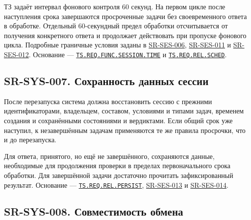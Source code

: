 \documentclass[12pt,a4paper]{article}
\begin{document}
ТЗ задаёт интервал фонового контроля 60 секунд. На первом цикле после наступления срока завершаются просроченные задачи без своевременного ответа в обработке. Отдельный 60-секундный предел обработки отсчитывается от получения конкретного ответа и продолжает действовать при пропуске фонового цикла. Подробные граничные условия заданы в {\hyperlink{sr-ses-006}{SR-SES-006}}, {\hyperlink{sr-ses-011}{SR-SES-011}} и {\hyperlink{sr-ses-012}{SR-SES-012}}. Основание --- {\href{../02\_Техническое\_задание/DOC-02\_Техническое\_задание.pdf\#ts-req-func-session-time}{\texttt{TS.\allowbreak{}REQ.\allowbreak{}FUNC.\allowbreak{}SESSION.\allowbreak{}TIME}}} и {\href{../02\_Техническое\_задание/DOC-02\_Техническое\_задание.pdf\#ts-req-rel-sched}{\texttt{TS.\allowbreak{}REQ.\allowbreak{}REL.\allowbreak{}SCHED}}}.

\subsection{SR-SYS-007. Сохранность данных сессии}\label{sr-sys-007-ux441ux43eux445ux440ux430ux43dux43dux43eux441ux442ux44c-ux434ux430ux43dux43dux44bux445-ux441ux435ux441ux441ux438ux438}

\hypertarget{sr-sys-007-сохранность-данных-сессии}{}

\hypertarget{sr-sys-007}{}

После перезапуска система должна восстановить сессию с прежними идентификаторами, владельцем, составом, условиями и типами задач, временем создания и сохранёнными состояниями и вердиктами. Если общий срок уже наступил, к незавершённым задачам применяются те же правила просрочки, что и до перезапуска.

Для ответа, принятого, но ещё не завершённого, сохраняются данные, необходимые для продолжения проверки в пределах первоначального срока обработки. Для завершённой задачи достаточно прочитать зафиксированный результат. Основание --- {\href{../02\_Техническое\_задание/DOC-02\_Техническое\_задание.pdf\#ts-req-rel-persist}{\texttt{TS.\allowbreak{}REQ.\allowbreak{}REL.\allowbreak{}PERSIST}}}, {\hyperlink{sr-ses-013}{SR-SES-013}} и {\hyperlink{sr-ses-014}{SR-SES-014}}.

\subsection{SR-SYS-008. Совместимость обмена}\label{sr-sys-008-ux441ux43eux432ux43cux435ux441ux442ux438ux43cux43eux441ux442ux44c-ux43eux431ux43cux435ux43dux430}
\end{document}

